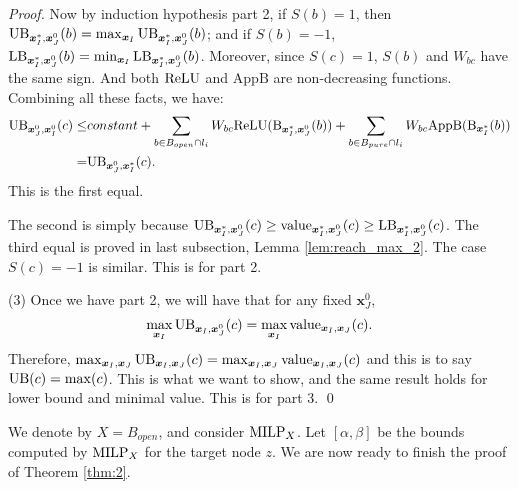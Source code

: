 \begin{proof}
				Now by induction hypothesis part 2, if $S(b)=1$, then $\mathrm{UB}_{\boldsymbol{x}^*_I,\boldsymbol{x}^0_J}(b)=\max_{\boldsymbol{x}_I}\mathrm{UB}_{\boldsymbol{x}^*_I,\boldsymbol{x}^0_J}(b)$; and if $S(b)=-1$, $\mathrm{LB}_{\boldsymbol{x}^*_I,\boldsymbol{x}^0_J}(b)=\min_{\boldsymbol{x}_I}\mathrm{LB}_{\boldsymbol{x}^*_I,\boldsymbol{x}^0_J}(b)$. Moreover, since $S(c)=1$, $S(b)$ and $W_{bc}$ have the same sign. And both $\mathrm{ReLU}$ and $\mathrm{AppB}$ are non-decreasing functions. Combining all these facts, we have:\begin{align*}
					\mathrm{UB}_{\boldsymbol{x}^0_J,\boldsymbol{x}^0_I}(c)\leq 
					&constant + \sum_{b\in B_{open}\cap l_i} W_{bc}\mathrm{ReLU}(\mathrm{B}_{\boldsymbol{x}^*_I,\boldsymbol{x}^0_J}(b)) + \sum_{b\in B_{pure}\cap l_{i}} W_{bc} \mathrm{AppB}(\mathrm{B}_{\boldsymbol{x}^*_I}(b))\\
					= & \mathrm{UB}_{\boldsymbol{x}^0_J,\boldsymbol{x}^*_I}(c). 
				\end{align*}  This is the first equal.
				
				The second is simply because $\mathrm{UB}_{\boldsymbol{x}^*_I,\boldsymbol{x}^0_J}(c)\geq {\textrm{value}}_{\boldsymbol{x}^*_I,\boldsymbol{x}^0_J}(c)\geq\mathrm{LB}_{\boldsymbol{x}^*_I,\boldsymbol{x}^0_J}(c)$.	The third equal is proved in last subsection, Lemma \ref{lem:reach_max_2}. The case $S(c)=-1$ is similar. This is for part 2.
				
				(3) Once we have part 2, we will have that for any fixed $\boldsymbol{x}^0_J$, $$\max_{\boldsymbol{x}_I} \mathrm{UB}_{\boldsymbol{x}_I,\boldsymbol{x}^0_J}(c)= \max_{\boldsymbol{x}_I} {\textrm{value}}_{\boldsymbol{x}_I,\boldsymbol{x}_J}(c).$$ Therefore, $\max_{\boldsymbol{x}_I,\boldsymbol{x}_J} \mathrm{UB}_{\boldsymbol{x}_I,\boldsymbol{x}_J}(c)= \max_{\boldsymbol{x}_I,\boldsymbol{x}_J} {\textrm{value}}_{\boldsymbol{x}_I,\boldsymbol{x}_J}(c)$ and this is to say $\mathrm{UB}(c)=\max(c)$. This is what we want to show, and the same result holds for lower bound and minimal value. This is for part 3. \qed

			\end{proof}

	\fi



	We denote by $X=B_{open}$, and consider ${\textrm{MILP}}_{X}$.
	Let $[\alpha,\beta]$ be the bounds computed by ${\textrm{MILP}}_{X}$ for the target node $z$. We are now ready to finish the proof of Theorem \ref{thm:2}.

